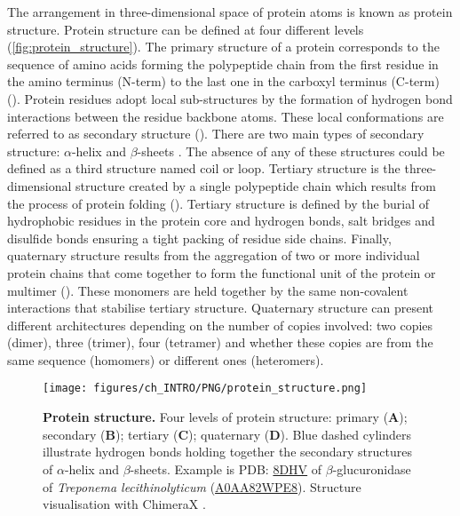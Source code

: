The arrangement in three-dimensional space of protein atoms is known as protein structure. Protein structure can be defined at four different levels (\autoref{fig:protein_structure}). The primary structure of a protein corresponds to the sequence of amino acids forming the polypeptide chain from the first residue in the amino terminus (N-term) to the last one in the carboxyl terminus (C-term) (). Protein residues adopt local sub-structures by the formation of hydrogen bond interactions between the residue backbone atoms. These local conformations are referred to as secondary structure (). There are two main types of secondary structure: $\alpha$-helix and $\beta$-sheets \cite{PAULING_1951_SS}. The absence of any of these structures could be defined as a third structure named coil or loop. Tertiary structure is the three-dimensional structure created by a single polypeptide chain which results from the process of protein folding (). Tertiary structure is defined by the burial of hydrophobic residues in the protein core and hydrogen bonds, salt bridges and disulfide bonds ensuring a tight packing of residue side chains. Finally, quaternary structure results from the aggregation of two or more individual protein chains that come together to form the functional unit of the protein or multimer (). These monomers are held together by the same non-covalent interactions that stabilise tertiary structure. Quaternary structure can present different architectures depending on the number of copies involved: two copies (dimer), three (trimer), four (tetramer) and whether these copies are from the same sequence (homomers) or different ones (heteromers).

\begin{figure}[htb!]
    \centering
    \texttt{[image: figures/ch\_INTRO/PNG/protein\_structure.png]}
    \caption[Protein structure]{\textbf{Protein structure.} Four levels of protein structure: primary (\textbf{A}); secondary (\textbf{B}); tertiary (\textbf{C}); quaternary (\textbf{D}). Blue dashed cylinders illustrate hydrogen bonds holding together the secondary structures of $\alpha$-helix and $\beta$-sheets. Example is PDB: \href{https://www.ebi.ac.uk/pdbe/entry/pdb/8dhv}{8DHV} \cite{LIETZAN_2023_BETAGLUCO} of $\beta$-glucuronidase of \textit{Treponema lecithinolyticum} (\href{https://www.uniprot.org/uniprotkb/A0AA82WPE8/entry}{A0AA82WPE8}). Structure visualisation with ChimeraX \cite{PETTERSEN_2021_CHIMERAX}.}
    \label{fig:protein_structure}
\end{figure}

